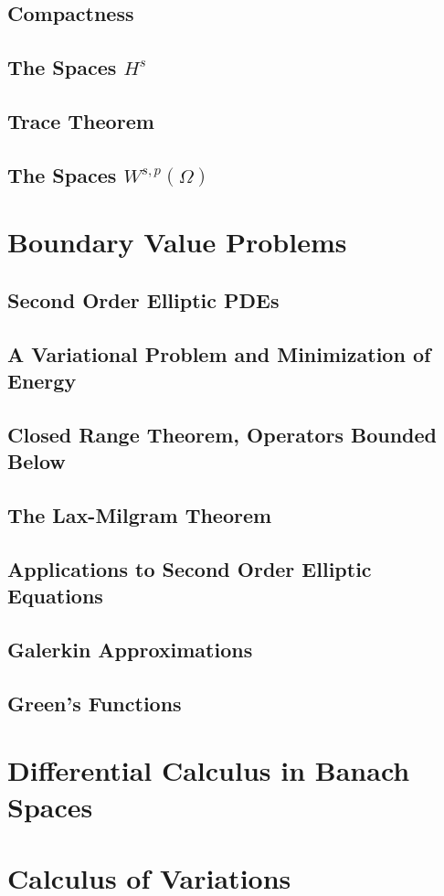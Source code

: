\documentclass[letterpaper,twoside,12pt]{article}
\theoremstyle{mystyle}
\begin{document}
\subsection{Compactness}
\subsection{The Spaces $H^s$}
\subsection{Trace Theorem}
\subsection{The Spaces $W^{s, p}\left( \Omega \right)$}

\newpage\section{Boundary Value Problems}
\subsection{Second Order Elliptic PDEs}
\subsection{A Variational Problem and Minimization of Energy}
\subsection{Closed Range Theorem, Operators Bounded Below}
\subsection{The Lax-Milgram Theorem}
\subsection{Applications to Second Order Elliptic Equations}
\subsection{Galerkin Approximations}
\subsection{Green's Functions}

\newpage\section{Differential Calculus in Banach Spaces}
\newpage\section{Calculus of Variations }
\end{document}
